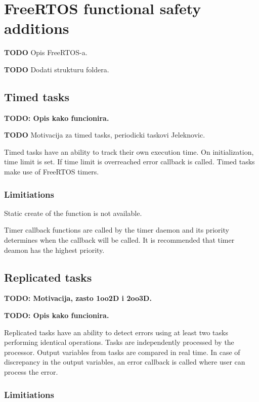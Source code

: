 \chapter{FreeRTOS functional safety additions}
\label{freertos_modification}

\textbf{TODO} Opis FreeRTOS-a.

\textbf{TODO} Dodati strukturu foldera.

\section{Timed tasks}

\textbf{TODO: Opis kako funcionira.}

\textbf{TODO} Motivacija za timed tasks, periodicki taskovi Jeleknovic.

Timed tasks have an ability to track their own execution time. On initialization, time limit is set. If time limit is overreached error callback is called. Timed tasks make use of FreeRTOS timers.

\subsection{Limitiations}

Static create of the function is not available.

Timer callback functions are called by the timer daemon and its priority determines when the callback will be called. It is recommended that timer deamon has the highest priority.

\section{Replicated tasks}

\textbf{TODO: Motivacija, zasto 1oo2D i 2oo3D.}

\textbf{TODO: Opis kako funcionira.}

Replicated tasks have an ability to detect errors using at least two tasks performing identical operations. Tasks are independently processed by the processor. Output variables from tasks are compared in real time. In case of discrepancy in the output variables, an error callback is called where user can process the error.

\subsection{Limitiations}

